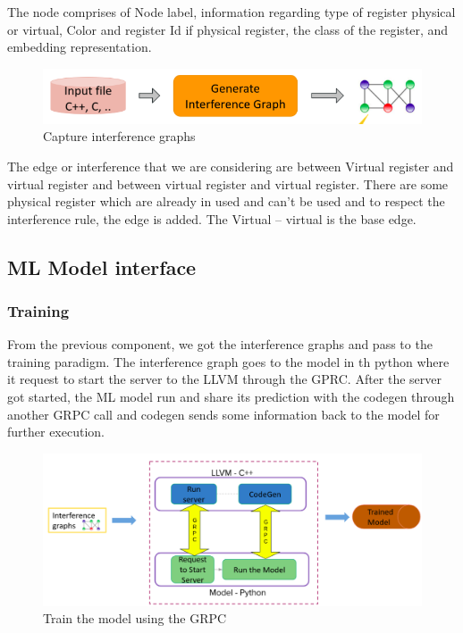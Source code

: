 The node comprises of Node label, information regarding type of register physical or virtual, Color and register Id if physical register, the class of the register, and embedding representation.

\begin{figure}[t]
    \centering
    \includegraphics[scale=0.4]{figures/chapter-5/mlra_cig.png}
    \caption{Capture interference graphs}
     \label{fig:mlra-cig}
\end{figure}

The edge or interference that we are considering are between Virtual register and virtual register and between virtual register and virtual register. There are some physical register which are already in used and can’t be used and to respect the interference rule, the edge is added. The Virtual -- virtual is the base edge.
\subsection{ML Model interface}

\subsubsection{Training}
From the previous component, we got the interference graphs and pass to the training paradigm. The interference graph goes to the model in th python where it request to start the server to the LLVM through the GPRC. After the server got started, the ML model run and share its prediction with the codegen through another GRPC call and codegen sends some information back to the model for further execution. 

\begin{figure}[t]
    \centering
    \includegraphics[scale=0.4]{figures/chapter-5/mlra_training.png}
    \caption{Train the model using the GRPC}
     \label{fig:mlra-training}
\end{figure}

